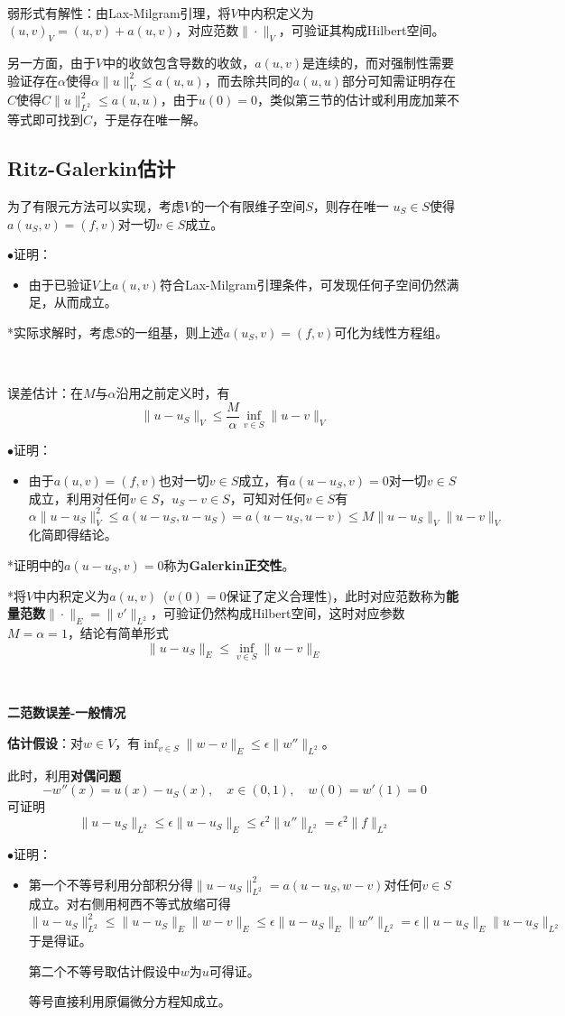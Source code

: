 \documentclass[a4paper,UTF8,fontset=windows]{ctexart}
\newcommand{\proo}[1]{{\kaishu $\bullet$证明：
\begin{itemize}
    \item[] #1
\end{itemize}
}}
\begin{document}
\

弱形式有解性：由Lax-Milgram引理，将$V$中内积定义为$(u,v)_V=(u,v)+a(u,v)$，对应范数$\|\cdot\|_V$，可验证其构成Hilbert空间。

另一方面，由于$V$中的收敛包含导数的收敛，$a(u,v)$是连续的，而对强制性需要验证存在$\alpha$使得$\alpha\|u\|_V^2\le a(u,u)$，而去除共同的$a(u,u)$部分可知需证明存在$C$使得$C\|u\|_{L^2}^2\le a(u,u)$，由于$u(0)=0$，类似第三节的估计或利用庞加莱不等式即可找到$C$，于是存在唯一解。

\subsection{Ritz-Galerkin估计}
为了有限元方法可以实现，考虑$V$的一个有限维子空间$S$，则存在唯一
$u_S\in S$使得$a(u_S,v)=(f,v)$对一切$v\in S$成立。

\proo{
    由于已验证$V$上$a(u,v)$符合Lax-Milgram引理条件，可发现任何子空间仍然满足，从而成立。
}

*实际求解时，考虑$S$的一组基，则上述$a(u_S,v)=(f,v)$可化为线性方程组。

\

误差估计：在$M$与$\alpha$沿用之前定义时，有
$$\|u-u_S\|_V\le\frac{M}{\alpha}\inf_{v\in S}\|u-v\|_V$$

\proo{
    由于$a(u,v)=(f,v)$也对一切$v\in S$成立，有$a(u-u_S,v)=0$对一切$v\in S$成立，利用对任何$v\in S$，$u_S-v\in S$，可知对任何$v\in S$有
    $$\alpha\|u-u_S\|_V^2\le a(u-u_S,u-u_S)=a(u-u_S,u-v)\le M\|u-u_S\|_V\|u-v\|_V$$
    化简即得结论。
}

*证明中的$a(u-u_S,v)=0$称为\textbf{Galerkin正交性}。

*将$V$中内积定义为$a(u,v)$\ ($v(0)=0$保证了定义合理性)，此时对应范数称为\textbf{能量范数}$\|\cdot\|_E=\|v'\|_{L^2}$，可验证仍然构成Hilbert空间，这时对应参数$M=\alpha=1$，结论有简单形式
$$\|u-u_S\|_E\le\inf_{v\in S}\|u-v\|_E$$

\

\textbf{二范数误差-一般情况}

\textbf{估计假设}：对$w\in V$，有$\inf_{v\in S}\|w-v\|_E\le\epsilon\|w''\|_{L^2}$。

此时，利用\textbf{对偶问题}
$$-w''(x)=u(x)-u_S(x),\quad x\in(0,1),\quad w(0)=w'(1)=0$$
可证明
$$\|u-u_S\|_{L^2}\le\epsilon\|u-u_S\|_E\le\epsilon^2\|u''\|_{L^2}=\epsilon^2\|f\|_{L^2}$$

\proo{
    第一个不等号利用分部积分得$\|u-u_S\|_{L^2}^2=a(u-u_S,w-v)$对任何$v\in S$成立。对右侧用柯西不等式放缩可得
    $$\|u-u_S\|_{L^2}^2\le\|u-u_S\|_E\|w-v\|_E\le\epsilon\|u-u_S\|_E\|w''\|_{L^2}=\epsilon\|u-u_S\|_E\|u-u_S\|_{L^2}$$
    于是得证。

    第二个不等号取估计假设中$w$为$u$可得证。

    等号直接利用原偏微分方程知成立。
}
\end{document}
